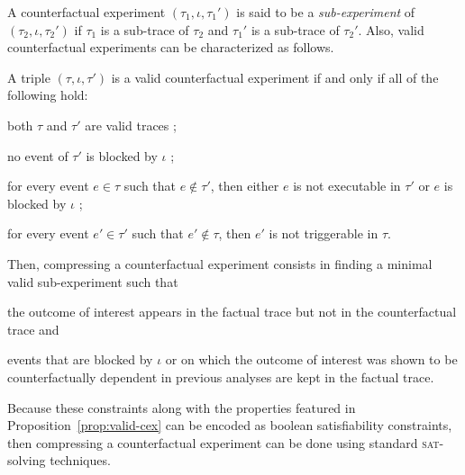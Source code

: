 A counterfactual experiment $(\tau_1, \iota, \tau_1')$ is said to be a
\emph{sub-experiment} of $(\tau_2, \iota, \tau_2')$ if $\tau_1$ is a
sub-trace of $\tau_2$ and $\tau_1'$ is a sub-trace of $\tau_2'$. Also,
valid counterfactual experiments can be characterized as follows.

\begin{proposition}%
  \label{prop:valid-cex}
  A triple $(\tau, \iota, \tau')$ is a valid counterfactual experiment if
  and only if all of the following hold:
  \begin{inparaenum}[(1)]
  \item \label{valid-cex:valid-traces} both $\tau$ and $\tau'$ are
    valid traces ;
  \item \label{valid-cex:no-blocking} no event of $\tau'$ is blocked
    by $\iota$ ;
  \item \label{valid-cex:co-occur} for every event $e \in \tau$
    such that $e \notin \tau'$, then either $e$ is not
    executable in $\tau'$ or $e$ is blocked by
    $\iota$ ;
  \item \label{valid-cex:co-occur2} for every event $e' \in \tau'$
    such that $e' \notin \tau$, then $e'$ is not triggerable in
    $\tau$.
  \end{inparaenum}
\end{proposition}

\noindent Then, compressing a counterfactual experiment consists
in finding a minimal valid sub-experiment such that
\begin{inparaenum}[(i)]
\item the outcome of interest appears in the factual trace but not in
the counterfactual trace and
\item events that are blocked by $\iota$ or on which the outcome of
  interest was shown to be counterfactually dependent in previous
  analyses are kept in the factual trace.
\end{inparaenum}
Because these constraints along with the properties featured in
Proposition~\ref{prop:valid-cex} can be encoded as boolean
satisfiability constraints, then compressing a counterfactual
experiment can be done using standard \textsc{sat}-solving techniques.

